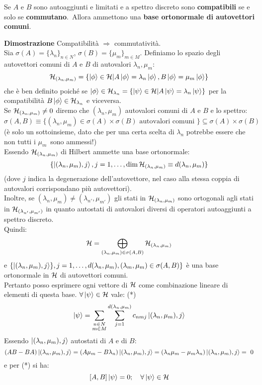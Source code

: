 \documentclass[../../FisicaTeorica.tex]{subfiles}
\begin{document}
\begin{thm}
Se $A$ e $B$ sono autoaggiunti e limitati e a spettro discreto sono \textbf{compatibili} se e solo se \textbf{commutano}.\ Allora ammettono una \textbf{base ortonormale di autovettori comuni}.
\end{thm}
\textbf{Dimostrazione} Compatibilità $\Rightarrow$ commutatività.\\
Sia $\sigma(A)=\{\lambda_n\}_{n\in N}$, $\sigma(B)=\{\mu_m\}_{m\in M}$. Definiamo lo spazio degli autovettori comuni di $A$ e $B$ di autovalori $\lambda_n, \mu_m$:
\[
\mathcal{H}_{(\lambda_n, \mu_m)}=\{\ket{\phi}\in \mathcal{H}| A\ket{\phi}=\lambda_n \ket{\phi}, 
B\ket{\phi}=\mu_m \ket{\phi}
\}
\]
che è ben definito poiché se $\ket{\phi}\in \mathcal{H}_{\lambda_n}= \{\ket{\psi}\in \mathcal{H}| A\ket{\psi}=\lambda_n\ket{\psi}\}$ per la compatibilità $B\ket{\phi} \in \mathcal{H}_{\lambda_n}$ e viceversa.\\
Se $\mathcal{H}_{(\lambda_n, \mu_m)}\neq 0$ diremo che $(\lambda_n, \mu_m)$ autovalori comuni di $A$ e $B$ e lo spettro:
\[
\sigma(A,B)\equiv \{
(\lambda_n, \mu_m) \in \sigma(A) \times \sigma(B) \text{ autovalori comuni }
\} \subseteq \sigma(A)\times \sigma(B)
\]
(è solo un sottoinsieme, dato che per una certa scelta di $\lambda_n$ potrebbe essere che non tutti i $\mu_m$\ sono ammessi!)\\
Essendo $\mathcal{H}_{(\lambda_n, \mu_m)}$ di Hilbert ammette una base ortonormale:
\[
\{\ket{(\lambda_n, \mu_m), j}, j = 1, \dots, \operatorname{dim}\mathcal{H}_{(\lambda_n, \mu_m)}\equiv d(\lambda_n, \mu_m)\}
\]
(dove $j$ indica la degenerazione dell'autovettore, nel caso alla stessa coppia di autovalori corrispondano più autovettori).\\
Inoltre, se $(\lambda_n, \mu_m)\neq (\lambda_{n'}, \mu_{m'})$ gli stati in $\mathcal{H}_{(\lambda_n, \mu_m)}$ sono ortogonali agli stati in $\mathcal{H}_{(\lambda_{n'}, \mu_{m'})}$ in quanto autostati di autovalori diversi di operatori autoaggiunti a spettro discreto.\\ %
Quindi:
\[
\mathcal{H} = \bigoplus_{(\lambda_n, \mu_m)\in \sigma(A,B)} \mathcal{H}_{(\lambda_n, \mu_m)}
\]
e $\{\ket{(\lambda_n, \mu_m), j}\}, j=1, \dots, d(\lambda_n, \mu_m), (\lambda_m, \mu_m)\in \sigma(A,B)\}$ è una base ortonormale in $\mathcal{H}$ di autovettori comuni.\\
Pertanto posso esprimere ogni vettore di $\mathcal{H}$ come combinazione lineare di elementi di questa base. $\forall \ket{\psi}\in \mathcal{H}$ vale:
(*)\[
\ket{\psi}=\sum_{\substack{n\in N\\m\in M}} \sum_{j=1}^{d(\lambda_n, \mu_m)}c_{nmj}\ket{(\lambda_n, \mu_m),j}
\]
Essendo $\ket{(\lambda_n, \mu_m), j}$ autostati di $A$ e di $B$:
\[
(AB-BA)\ket{(\lambda_n, \mu_m), j} = (A\mu_m -B\lambda_n)\ket{(\lambda_n, \mu_m),j}= (\lambda_n \mu_m - \mu_m \lambda_n)\ket{(\lambda_n, \mu_m),j} =\ 0
\]
e per (*) si ha:
\[
[A,B]\ket{\psi} = 0; \quad \forall \ket{\psi}\in \mathcal{H}
\]
\end{document}
